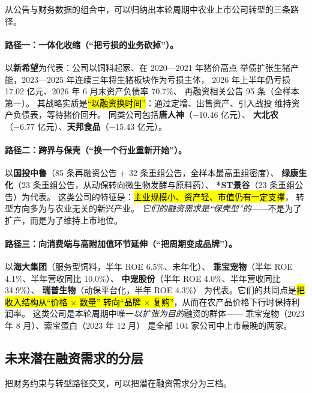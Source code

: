 从公告与财务数据的组合中，可以归纳出本轮周期中农业上市公司转型的三条路径。

\paragraph{路径一：一体化收缩（“把亏损的业务砍掉”）。}
以\textbf{新希望}为代表：公司以饲料起家、在 2020---2021 年猪价高点
举债扩张生猪产能，2023---2025 年连续三年将生猪板块作为亏损主体，
2026 年上半年仍亏损 \num{17.02} 亿元、2026 年 6 月末资产负债率 \num{70.7}\%、
再融资相关公告 \num{95} 条（全样本第一）。
其战略实质是\hl{“以融资换时间”}：通过定增、出售资产、引入战投
维持资产负债表，等待猪价回升。
同类公司包括\textbf{唐人神}（\num{-10.46} 亿元）、
\textbf{大北农}（\num{-6.77} 亿元）、\textbf{天邦食品}（\num{-15.43} 亿元）。

\paragraph{路径二：跨界与保壳（“换一个行业重新开始”）。}
以\textbf{国投中鲁}（\num{85} 条再融资公告 + \num{32} 条重组公告，全样本最高重组密度）、
\textbf{绿康生化}（\num{23} 条重组公告，从动保转向微生物发酵与原料药）、
\textbf{*ST景谷}（\num{23} 条重组公告）为代表。
这类公司的特征是：\hl{主业规模小、资产轻、市值仍有一定支撑}，
转型方向多为与农业无关的新兴产业。
\emph{它们的融资需求是“保壳型”的}——不是为了扩产，而是为了维持上市地位。

\paragraph{路径三：向消费端与高附加值环节延伸（“把周期变成品牌”）。}
以\textbf{海大集团}（服务型饲料，半年 ROE \num{6.5}\%、未年化）、
\textbf{乖宝宠物}（半年 ROE \num{4.1}\%、半年营收同比 \num{+10.0}\%）、
\textbf{中宠股份}（半年 ROE \num{4.0}\%、半年营收同比 \num{+34.9}\%）、
\textbf{瑞普生物}（动保平台化，半年 ROE \num{4.3}\%）
为代表。它们的共同点是\hl{把收入结构从“价格 $\times$ 数量”
转向“品牌 $\times$ 复购”}，从而在农产品价格下行时保持利润率。
这类公司是本轮周期中唯一\emph{以扩张为目的}融资的群体——
乖宝宠物（2023 年 8 月）、索宝蛋白（2023 年 12 月）
是全部 \num{104} 家公司中上市最晚的两家。

\subsection{未来潜在融资需求的分层}
\label{sec:financing-need}

把财务约束与转型路径交叉，可以把潜在融资需求分为三档。


